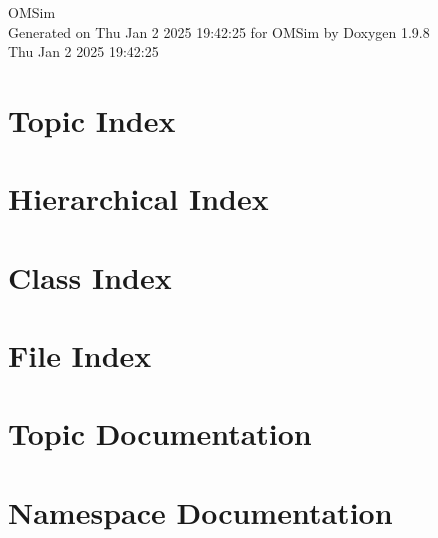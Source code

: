 \documentclass[twoside]{book}
\newcommand{\+}{\discretionary{\mbox{\scriptsize$\hookleftarrow$}}{}{}}
\newcommand{\clearemptydoublepage}{%
    \newpage{\pagestyle{empty}\cleardoublepage}%
  }
\begin{document}
  \raggedbottom
    \hypersetup{pageanchor=false,
                bookmarksnumbered=true,
                pdfencoding=unicode
               }
  \begin{titlepage}
  \vspace*{7cm}
  \begin{center}%
  {\Large OMSim}\\
  \vspace*{1cm}
  {\large Generated on Thu Jan 2 2025 19\+:42\+:25 for OMSim by Doxygen 1.9.8}\\
    \vspace*{0.5cm}
    {\small Thu Jan 2 2025 19:42:25}
  \end{center}
  \end{titlepage}
  \clearemptydoublepage
  \tableofcontents
  \clearemptydoublepage
  \hypersetup{pageanchor=true}








\chapter{Topic Index}

\chapter{Hierarchical Index}

\chapter{Class Index}

\chapter{File Index}

\chapter{Topic Documentation}




\chapter{Namespace Documentation}



\end{document}
